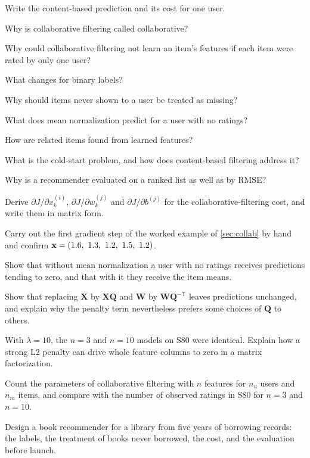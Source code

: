 \sq Write the content-based prediction and its cost for one user.

\sq Why is collaborative filtering called collaborative?

\sq Why could collaborative filtering not learn an item's features if each item
were rated by only one user?

\sq What changes for binary labels?

\sq Why should items never shown to a user be treated as missing?

\sq What does mean normalization predict for a user with no ratings?

\sq How are related items found from learned features?

\sq What is the cold-start problem, and how does content-based filtering address
it?

\sq Why is a recommender evaluated on a ranked list as well as by RMSE?


\ap Derive $\partial J/\partial x^{(i)}_k$, $\partial J/\partial w^{(j)}_k$ and
$\partial J/\partial b^{(j)}$ for the collaborative-filtering cost, and write them
in matrix form.

\ap Carry out the first gradient step of the worked example of \cref{sec:collab}
by hand and confirm $\mathbf{x} = (1.6,\ 1.3,\ 1.2,\ 1.5,\ 1.2)$.

\ap Show that without mean normalization a user with no ratings receives
predictions tending to zero, and that with it they receive the item means.

\ap Show that replacing $\mathbf{X}$ by $\mathbf{X}\mathbf{Q}$ and $\mathbf{W}$ by
$\mathbf{W}\mathbf{Q}^{-\mathsf T}$ leaves predictions unchanged, and explain why
the penalty term nevertheless prefers some choices of $\mathbf{Q}$ to others.

\ap With $\lambda = 10$, the $n = 3$ and $n = 10$ models on S80 were identical.
Explain how a strong L2 penalty can drive whole feature columns to zero in a
matrix factorization.

\ap Count the parameters of collaborative filtering with $n$ features for $n_u$
users and $n_m$ items, and compare with the number of observed ratings in S80
for $n = 3$ and $n = 10$.


\dpr Design a book recommender for a library from five years of borrowing records:
the labels, the treatment of books never borrowed, the cost, and the evaluation
before launch.

